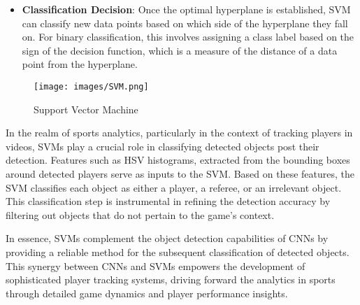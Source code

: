 \documentclass[12pt, letterpaper]{article}
\begin{document}
{\begin{spacing}{1.2}
\begin{itemize}
    \item \textbf{Classification Decision}: Once the optimal hyperplane is established, SVM can classify new data points based on which side of the hyperplane they fall on. For binary classification, this involves assigning a class label based on the sign of the decision function, which is a measure of the distance of a data point from the hyperplane.
\end{itemize}

\begin{figure}[htbp]
\centering
\texttt{[image: images/SVM.png]}
\captionsetup{font=large}
\caption{Support Vector Machine}
\label{fig:SVM}
\end{figure}

In the realm of sports analytics, particularly in the context of tracking players in videos, SVMs play a crucial role in classifying detected objects post their detection. Features such as HSV histograms, extracted from the bounding boxes around detected players serve as inputs to the SVM. Based on these features, the SVM classifies each object as either a player, a referee, or an irrelevant object. This classification step is instrumental in refining the detection accuracy by filtering out objects that do not pertain to the game's context.

In essence, SVMs complement the object detection capabilities of CNNs by providing a reliable method for the subsequent classification of detected objects. This synergy between CNNs and SVMs empowers the development of sophisticated player tracking systems, driving forward the analytics in sports through detailed game dynamics and player performance insights.

\end{spacing}
}
\end{document}
